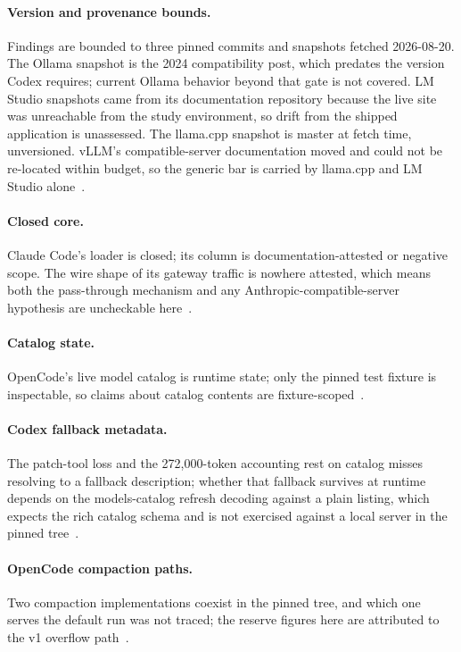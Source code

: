 \documentclass{article}
\newcommand{\codex}[0]{Codex}
\newcommand{\occ}[0]{OpenCode}
\newcommand{\ccc}[0]{Claude Code}
\begin{document}
\paragraph{Version and provenance bounds.} Findings are bounded to three
pinned commits and snapshots fetched 2026-08-20. The Ollama snapshot is
the 2024 compatibility post, which predates the version \codex{}
requires; current Ollama behavior beyond that gate is not covered. LM
Studio snapshots came from its documentation repository because the live
site was unreachable from the study environment, so drift from the
shipped application is unassessed. The llama.cpp snapshot is master at
fetch time, unversioned. vLLM's compatible-server documentation moved
and could not be re-located within budget, so the generic bar is carried
by llama.cpp and LM Studio alone~\citep{ollamaCompatDocs,lmstudioApiDocs,%
llamaCppServerDocs}.

\paragraph{Closed core.} \ccc{}'s loader is closed; its column is
documentation-attested or negative scope. The wire shape of its gateway
traffic is nowhere attested, which means both the pass-through mechanism
and any Anthropic-compatible-server hypothesis are uncheckable
here~\citep{claudeCodeModelDocs,claudeCodeBedrockDocs}.

\paragraph{Catalog state.} \occ{}'s live model catalog is runtime state;
only the pinned test fixture is inspectable, so claims about catalog
contents are fixture-scoped~\citep{opencodeRepo}.

\paragraph{Codex fallback metadata.} The patch-tool loss and the
272{,}000-token accounting rest on catalog misses resolving to a
fallback description; whether that fallback survives at runtime depends
on the models-catalog refresh decoding against a plain 
listing, which expects the rich catalog schema and is not exercised
against a local server in the pinned tree~\citep{codexRepo}.

\paragraph{OpenCode compaction paths.} Two compaction implementations
coexist in the pinned tree, and which one serves the default run was not
traced; the reserve figures here are attributed to the v1 overflow
path~\citep{opencodeRepo}.
\end{document}
